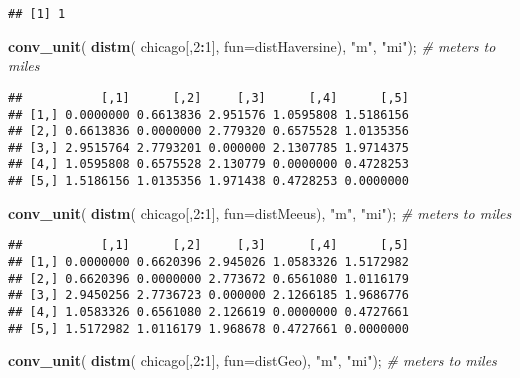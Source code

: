 \documentclass[
]{article}
\newenvironment{Shaded}{\begin{snugshade}}{\end{snugshade}}
\newcommand{\CommentTok}[1]{\textcolor[rgb]{0.56,0.35,0.01}{\textit{#1}}}
\newcommand{\DataTypeTok}[1]{\textcolor[rgb]{0.13,0.29,0.53}{#1}}
\newcommand{\DecValTok}[1]{\textcolor[rgb]{0.00,0.00,0.81}{#1}}
\newcommand{\KeywordTok}[1]{\textcolor[rgb]{0.13,0.29,0.53}{\textbf{#1}}}
\newcommand{\NormalTok}[1]{#1}
\newcommand{\OperatorTok}[1]{\textcolor[rgb]{0.81,0.36,0.00}{\textbf{#1}}}
\newcommand{\StringTok}[1]{\textcolor[rgb]{0.31,0.60,0.02}{#1}}
\begin{document}
\begin{verbatim}
## [1] 1
\end{verbatim}

\begin{Shaded}
\begin{Highlighting}[]
\KeywordTok{conv\_unit}\NormalTok{(  }\KeywordTok{distm}\NormalTok{( chicago[,}\DecValTok{2}\OperatorTok{:}\DecValTok{1}\NormalTok{], }\DataTypeTok{fun=}\NormalTok{distHaversine),  }\StringTok{"m"}\NormalTok{, }\StringTok{"mi"}\NormalTok{); }\CommentTok{\# meters to miles}
\end{Highlighting}
\end{Shaded}

\begin{verbatim}
##           [,1]      [,2]     [,3]      [,4]      [,5]
## [1,] 0.0000000 0.6613836 2.951576 1.0595808 1.5186156
## [2,] 0.6613836 0.0000000 2.779320 0.6575528 1.0135356
## [3,] 2.9515764 2.7793201 0.000000 2.1307785 1.9714375
## [4,] 1.0595808 0.6575528 2.130779 0.0000000 0.4728253
## [5,] 1.5186156 1.0135356 1.971438 0.4728253 0.0000000
\end{verbatim}

\begin{Shaded}
\begin{Highlighting}[]
\KeywordTok{conv\_unit}\NormalTok{(  }\KeywordTok{distm}\NormalTok{( chicago[,}\DecValTok{2}\OperatorTok{:}\DecValTok{1}\NormalTok{], }\DataTypeTok{fun=}\NormalTok{distMeeus),  }\StringTok{"m"}\NormalTok{, }\StringTok{"mi"}\NormalTok{); }\CommentTok{\# meters to miles}
\end{Highlighting}
\end{Shaded}

\begin{verbatim}
##           [,1]      [,2]     [,3]      [,4]      [,5]
## [1,] 0.0000000 0.6620396 2.945026 1.0583326 1.5172982
## [2,] 0.6620396 0.0000000 2.773672 0.6561080 1.0116179
## [3,] 2.9450256 2.7736723 0.000000 2.1266185 1.9686776
## [4,] 1.0583326 0.6561080 2.126619 0.0000000 0.4727661
## [5,] 1.5172982 1.0116179 1.968678 0.4727661 0.0000000
\end{verbatim}

\begin{Shaded}
\begin{Highlighting}[]
\KeywordTok{conv\_unit}\NormalTok{(  }\KeywordTok{distm}\NormalTok{( chicago[,}\DecValTok{2}\OperatorTok{:}\DecValTok{1}\NormalTok{], }\DataTypeTok{fun=}\NormalTok{distGeo),  }\StringTok{"m"}\NormalTok{, }\StringTok{"mi"}\NormalTok{); }\CommentTok{\# meters to miles}
\end{Highlighting}
\end{Shaded}
\end{document}
